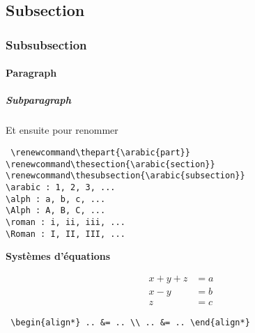 \documentclass{report}
\begin{document}
\subsection{Subsection}

\subsubsection{Subsubsection}

\paragraph{Paragraph}

\subparagraph{Subparagraph}

\paragraph{}

\paragraph{}

Et ensuite pour renommer

\texttt{ 
\textbackslash{}renewcommand\textbackslash{}thepart\{\textbackslash{}arabic\{part\}\} \\
\textbackslash{}renewcommand\textbackslash{}thesection\{\textbackslash{}arabic\{section\}\} \\
\textbackslash{}renewcommand\textbackslash{}thesubsection\{\textbackslash{}arabic\{subsection\}\} \\
\textbackslash{}arabic : 1, 2, 3, ... \\
\textbackslash{}alph : a, b, c, ... \\
\textbackslash{}Alph : A, B, C, ... \\
\textbackslash{}roman : i, ii, iii, ... \\
\textbackslash{}Roman : I, II, III, ...
}	

\newpage

\textbf{Systèmes d'équations}

\begin{align*}
x + y + z &= a\\
x - y &= b\\
z &= c
\end{align*}

\begin{center}
\texttt{
\textbackslash{}begin\{align*\} .. \&= .. \textbackslash{}\textbackslash{} .. \&= .. \textbackslash{}end\{align*\}
}\\
\end{center}
\end{document}
